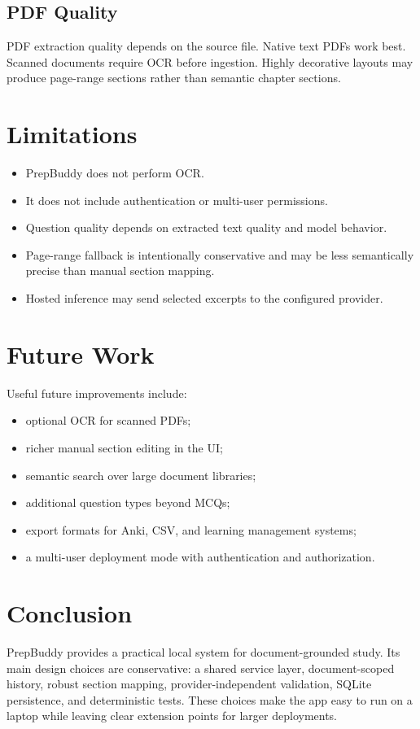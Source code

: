 \documentclass[11pt]{article}
\begin{document}
\subsection{PDF Quality}

PDF extraction quality depends on the source file. Native text PDFs work best. Scanned documents require OCR before ingestion. Highly decorative layouts may produce page-range sections rather than semantic chapter sections.

\section{Limitations}

\begin{itemize}
  \item PrepBuddy does not perform OCR.
  \item It does not include authentication or multi-user permissions.
  \item Question quality depends on extracted text quality and model behavior.
  \item Page-range fallback is intentionally conservative and may be less semantically precise than manual section mapping.
  \item Hosted inference may send selected excerpts to the configured provider.
\end{itemize}

\section{Future Work}

Useful future improvements include:

\begin{itemize}
  \item optional OCR for scanned PDFs;
  \item richer manual section editing in the UI;
  \item semantic search over large document libraries;
  \item additional question types beyond MCQs;
  \item export formats for Anki, CSV, and learning management systems;
  \item a multi-user deployment mode with authentication and authorization.
\end{itemize}

\section{Conclusion}

PrepBuddy provides a practical local system for document-grounded study. Its main design choices are conservative: a shared service layer, document-scoped history, robust section mapping, provider-independent validation, SQLite persistence, and deterministic tests. These choices make the app easy to run on a laptop while leaving clear extension points for larger deployments.
\end{document}
